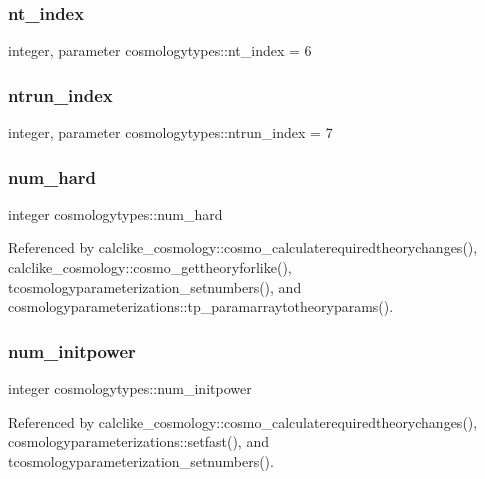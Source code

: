 \subsubsection{\texorpdfstring{nt\+\_\+index}{nt\_index}}
{\footnotesize\ttfamily integer, parameter cosmologytypes\+::nt\+\_\+index = 6}

\mbox{\label{namespacecosmologytypes_a36ff14458bf8e280f350800fc8bd0ba7}} 
\subsubsection{\texorpdfstring{ntrun\+\_\+index}{ntrun\_index}}
{\footnotesize\ttfamily integer, parameter cosmologytypes\+::ntrun\+\_\+index = 7}

\mbox{\label{namespacecosmologytypes_a570495f7e1339d51d190e98980c9b01b}} 
\subsubsection{\texorpdfstring{num\+\_\+hard}{num\_hard}}
{\footnotesize\ttfamily integer cosmologytypes\+::num\+\_\+hard}



Referenced by calclike\+\_\+cosmology\+::cosmo\+\_\+calculaterequiredtheorychanges(), calclike\+\_\+cosmology\+::cosmo\+\_\+gettheoryforlike(), tcosmologyparameterization\+\_\+setnumbers(), and cosmologyparameterizations\+::tp\+\_\+paramarraytotheoryparams().

\mbox{\label{namespacecosmologytypes_aab2abf3c84749a23d7bcd331d20deacb}} 
\subsubsection{\texorpdfstring{num\+\_\+initpower}{num\_initpower}}
{\footnotesize\ttfamily integer cosmologytypes\+::num\+\_\+initpower}



Referenced by calclike\+\_\+cosmology\+::cosmo\+\_\+calculaterequiredtheorychanges(), cosmologyparameterizations\+::setfast(), and tcosmologyparameterization\+\_\+setnumbers().

